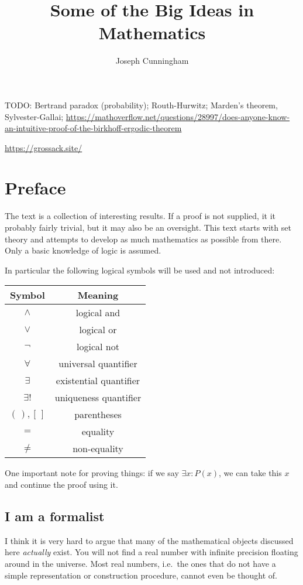 \documentclass{report}
\title{Some of the Big Ideas in Mathematics}
\author{Joseph Cunningham}
\date{}
\begin{document}
\maketitle
\tableofcontents

TODO: Bertrand paradox (probability); Routh-Hurwitz; Marden's theorem, Sylvester-Gallai; \url{https://mathoverflow.net/questions/28997/does-anyone-know-an-intuitive-proof-of-the-birkhoff-ergodic-theorem}

\url{https://grossack.site/}

\chapter{Preface}
The text is a collection of interesting results. If a proof is not supplied, it it probably fairly trivial, but it may also be an oversight. This text starts with set theory and attempts to develop as much mathematics as possible from there. Only a basic knowledge of logic is assumed.

In particular the following logical symbols will be used and not introduced:
\begin{center}
\begin{tabular}{ c c }
Symbol & Meaning \\
 \hline
$\land$ & logical and \\
$\lor$ & logical or \\
$\neg$ & logical not \\
$\forall$ & universal quantifier \\
$\exists$ & existential quantifier \\
$\exists!$ & uniqueness quantifier \\
$(\,), [\,]$ & parentheses \\
$=$ & equality \\
$\neq$ & non-equality
\end{tabular}
\end{center}

One important note for proving things: if we say $\exists x: P(x)$, we can take this $x$ and continue the proof using it.

\section{I am a formalist}
I think it is very hard to argue that many of the mathematical objects discussed here \textit{actually} exist. You will not find a real number with infinite precision floating around in the universe. Most real numbers, i.e.\ the ones that do not have a simple representation or construction procedure, cannot even be thought of.
\end{document}
